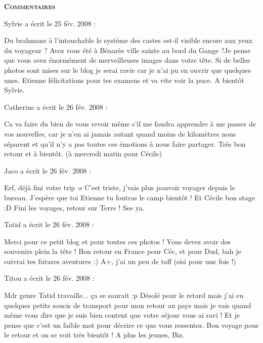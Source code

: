 \bigskip
\textbf{\textsc{Commentaires}}

\medskip
Sylvie a écrit le 25 fév. 2008 :
\begin{displayquote}
Du brahmane à l'intouchable le système des castes est-il visible encore aux yeux du voyageur ?
Avez vous été à Bénarès ville sainte au bord du Gange ?Je pense que vous avez énormément de merveilleuses images dans votre tête. Si de belles photos sont mises sur le blog je serai ravie car je n'ai pu en ouvrir que quelques unes. Etienne félicitations pour tes examens et va vite voir la puce. A bientôt Sylvie.
\end{displayquote}

\medskip
Catherine a écrit le 26 fév. 2008 :
\begin{displayquote}
Ca va faire du bien de vous revoir même s'il me faudra apprendre à me passer de vos nouvelles, car je n'en ai jamais autant quand moins de kilomètres nous séparent et qu'il n'y a pas toutes ces émotions à nous faire partager.
Très bon retour et à bientôt. (à mercredi matin pour Cécile)
\end{displayquote}

\medskip
Jaco a écrit le 26 fév. 2008 :
\begin{displayquote}
Erf, déjà fini votre trip :s C'est triste, j'vais plus pouvoir voyager depuis le bureau.
J'espère que toi Etienne tu foutras le camp bientôt !
Et Cécile bon stage :D Fini les voyages, retour sur Terre !
See ya.
\end{displayquote}

\medskip
Tatid a écrit le 26 fév. 2008 :
\begin{displayquote}
Merci pour ce petit blog et pour toutes ces photos ! Vous devez avoir des souvenirs plein la tête !
Bon retour en France pour Céc, et pour Dud, bah je suivrai tes futures aventures :)
A+, j'ai un peu de taff (sisi pour une fois !)
\end{displayquote}

\medskip
Titou a écrit le 26 fév. 2008 :
\begin{displayquote}
Mdr genre Tatid travaille... ça se saurait :p
Désolé pour le retard mais j'ai eu quelques petits soucis de transport pour mon retour au pays mais je vais quand même vous dire que je suis bien content que votre séjour vous ai ravi ! Et je pense que c'est un faible mot pour décrire ce que vous ressentez. Bon voyage pour le retour et on se voit très bientôt !
A plus les jeunes, Biz.
\end{displayquote}

